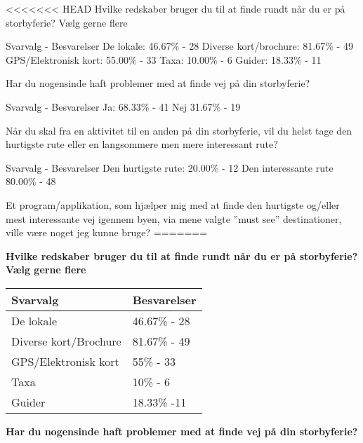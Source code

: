 <<<<<<< HEAD
Hvilke redskaber bruger du til at finde rundt når du er på storbyferie?
Vælg gerne flere

Svarvalg - Besvarelser\newline
De lokale:
46.67\%  -  28 \newline
Diverse kort/brochure:
81.67\%  -  49 \newline
GPS/Elektronisk kort:
55.00\%  -  33 \newline
Taxa:
10.00\%  -   6 \newline
Guider:
18.33\% - 11 \newline


Har du nogensinde haft problemer med at finde vej på din storbyferie?

Svarvalg - Besvarelser \newline
Ja: 
68.33\%  -  41 \newline
Nej
31.67\%  -  19

Når du skal fra en aktivitet til en anden på din storbyferie, vil du helst tage den hurtigste rute eller en langsommere men mere interessant rute?

Svarvalg - Besvarelser \newline
Den hurtigste rute:
20.00\%  -  12 \newline
Den interessante rute
80.00\%  -  48 

Et program/applikation, som hjælper mig med at finde den hurtigste og/eller mest interessante vej igennem byen, via mene valgte ”must see” destinationer, ville være noget jeg kunne bruge? \newline
=======

\textbf{Hvilke redskaber bruger du til at finde rundt når du er på storbyferie?
Vælg gerne flere}

	\begin{tabular}{| l | l |}
	\hline
	Svarvalg & Besvarelser \\ \hline
	De lokale & 46.67\% - 28 \\ \hline
	Diverse kort/Brochure & 81.67\% - 49 \\ \hline
	GPS/Elektronisk kort & 55\% - 33 \\ \hline
	Taxa & 10\% - 6 \\ \hline
	Guider & 18.33\% -11 \\
	\hline
	\end{tabular}
\newline
\newline 	


\textbf{Har du nogensinde haft problemer med at finde vej på din storbyferie?}

